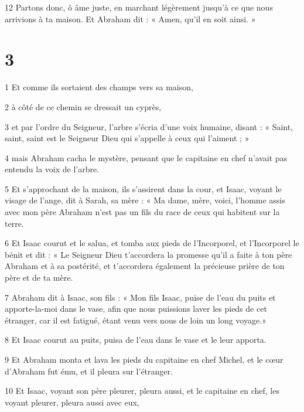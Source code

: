 \par 12 Partons donc, ô âme juste, en marchant légèrement jusqu'à ce que nous arrivions à ta maison. Et Abraham dit : « Amen, qu’il en soit ainsi. »


\chapter{3}

\par 1 Et comme ils sortaient des champs vers sa maison,

\par 2 à côté de ce chemin se dressait un cyprès,

\par 3 et par l'ordre du Seigneur, l'arbre s'écria d'une voix humaine, disant : « Saint, saint, saint est le Seigneur Dieu qui s'appelle à ceux qui l'aiment ; »

\par 4 mais Abraham cacha le mystère, pensant que le capitaine en chef n'avait pas entendu la voix de l'arbre.

\par 5 Et s'approchant de la maison, ils s'assirent dans la cour, et Isaac, voyant le visage de l'ange, dit à Sarah, sa mère : « Ma dame, mère, voici, l'homme assis avec mon père Abraham n'est pas un fils du race de ceux qui habitent sur la terre.

\par 6 Et Isaac courut et le salua, et tomba aux pieds de l'Incorporel, et l'Incorporel le bénit et dit : « Le Seigneur Dieu t'accordera la promesse qu'il a faite à ton père Abraham et à sa postérité, et t'accordera également la précieuse prière de ton père et de ta mère.

\par 7 Abraham dit à Isaac, son fils : « Mon fils Isaac, puise de l'eau du puits et apporte-la-moi dans le vase, afin que nous puissions laver les pieds de cet étranger, car il est fatigué, étant venu vers nous de loin un long voyage.»

\par 8 Et Isaac courut au puits, puisa de l'eau dans le vase et le leur apporta.

\par 9 Et Abraham monta et lava les pieds du capitaine en chef Michel, et le cœur d'Abraham fut ému, et il pleura sur l'étranger.

\par 10 Et Isaac, voyant son père pleurer, pleura aussi, et le capitaine en chef, les voyant pleurer, pleura aussi avec eux,

